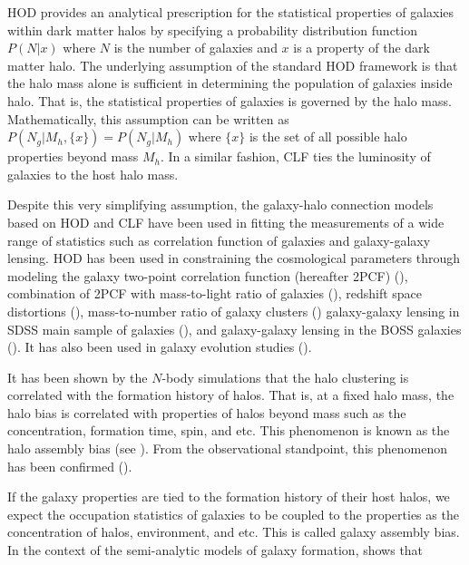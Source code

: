 \documentclass[12pt, preprint]{emulateapj}
\begin{document}
HOD provides an analytical prescription for the statistical properties of galaxies within dark matter halos by specifying a probability distribution function $P(N|x)$ where $N$ is the number of galaxies and $x$ is a property of the dark matter halo. The underlying assumption of the standard HOD framework is 
that the halo mass alone is sufficient in determining the
population of galaxies inside halo. That is, the statistical properties of 
galaxies is governed by the halo mass. Mathematically, this assumption can be 
written as $P(N_g|M_h,\{x\})=P(N_g|M_h)$ where $\{x\}$ is the set of all 
possible halo properties beyond mass $M_{h}$. In a similar fashion, CLF ties the luminosity of galaxies to the host halo mass.

Despite this very simplifying assumption, the galaxy-halo connection models based on HOD and CLF have been used in fitting the measurements of a wide range of statistics such as correlation function of galaxies and galaxy-galaxy lensing. HOD has been used in constraining the cosmological parameters through modeling the galaxy two-point correlation function (hereafter 2PCF) (\citealt{abazajian2005}), combination of 2PCF with mass-to-light ratio of galaxies (\citealt{tinker05}), redshift space distortions (\citealt{tinker_rsd2007}), mass-to-number ratio of galaxy clusters (\citealt{tinker2012}) galaxy-galaxy lensing in SDSS main sample of galaxies (\citealt{vdb03,cacciato13,more13,vdb13}), and galaxy-galaxy lensing in the BOSS galaxies (\citealt{miyatake15,more15}). It has also been used in galaxy evolution studies (\citealt{conroy09,leauthaud12,behroozi13}).

It has been shown by the $N$-body simulations that the halo clustering is correlated with the formation history of halos. That is, at a fixed halo mass, the halo bias is correlated with properties of halos beyond mass such as the concentration, formation time, spin, and etc. This phenomenon is known as the halo assembly bias (see \citealt{sheth2004,gao2005, harker2006, weschler2006, gao2007,croton2007,wang2007,angulo2008,dalal2008,li2008,sunayama2016}). From the observational standpoint, this phenomenon has been confirmed
(\citealt{miyatake2016,more2016}). 

If the galaxy properties are tied to the formation history of their host halos, we expect the occupation statistics of galaxies to be coupled to the properties as the concentration of halos, environment, and etc. This is called galaxy assembly bias. In the context of the semi-analytic models of galaxy formation, \citealt{croton2007} shows that 
\end{document}
